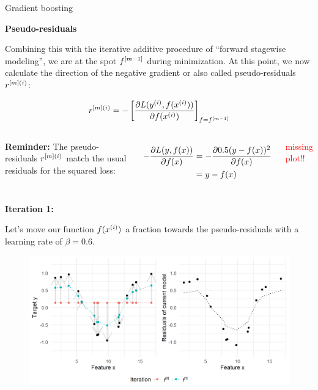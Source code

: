 \begin{vbframe}{Gradient boosting}
\begin{footnotesize}
\textbf{Pseudo-residuals}

\vspace*{0.2cm}
Combining this with the iterative additive procedure
of \enquote{forward stagewise modeling}, we are at the spot $f^{[m-1]}$ during minimization.
At this point, we now calculate the direction of the negative gradient or also called pseudo-residuals $r^{[m](i)}$:

$$ r^{[m](i)} = -\left[\frac{\partial L(y^{(i)}, f(x^{(i)}))}{\partial f(x^{(i)})}\right]_{f=f^{[m-1]}} $$

\lz

\begin{columns}
\column{5cm}
\textbf{Reminder:} The pseudo-residuals $r^{[m](i)}$ match the usual residuals for the squared loss:


\begin{align*}
- \frac{\partial L(y, f(x))}{\partial f(x)} & = - \frac{\partial 0.5(y - f(x))^2}{\partial f(x)}\\ 
                 & = y - f(x)
\end{align*}

\column{5cm}
\begin{center}
\textcolor{red}{missing plot!!}
\end{center}

\end{columns}
\end{footnotesize}
\framebreak

\textbf{Iteration 1:}

Let's move our function $f(x^{(i)})$ a fraction towards the pseudo-residuals with a learning rate of $\beta = 0.6$.


\begin{figure}
  \includegraphics[width=\textwidth]{figure/fig-gb-concept-pseudo-resi-1.png}
\end{figure}


\end{vbframe}
